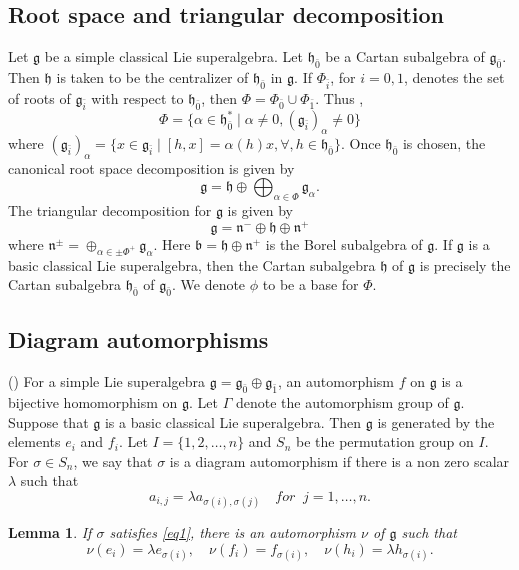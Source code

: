 \documentclass[11pt]{amsart}
\theoremstyle{plain}
\newtheorem{lemma}[thm]{Lemma}
\theoremstyle{definition}
\newcommand{\g}{\mathfrak{g}}
\newcommand{\h}{\mathfrak{h}}
\newcommand{\n}{\mathfrak{n}}
\begin{document}
\subsection{Root space and triangular decomposition}
Let $\g$ be a simple classical Lie superalgebra. Let $\h_{\bar{0}}$ be a Cartan subalgebra of $\g_{\bar{0}}$. Then $\h$ is taken to be the centralizer of $\h_{\bar{0}}$ in $\g$. If $\Phi_{\bar{i}}$, for $i=0,1$, denotes the set of roots of $\g_{\bar{i}}$ with respect to $\h_{\bar{0}}$, then $\Phi=\Phi_{\bar{0}}\cup \Phi_{\bar{1}}$. Thus \label{pg:2},
\begin{equation*}
    \Phi=\{\alpha\in\h_{\bar{0}}^*\mid \alpha\neq 0, (\g_{\bar{i}})_{\alpha}\neq 0\}
\end{equation*}
where $(\g_{\bar{i}})_{\alpha}=\{x\in\g_{\bar{i}}\mid [h, x]=\alpha(h)x,\forall, h\in\h_{\bar{0}}\}$.
Once $\h_{\bar{0}}$ is chosen, the canonical root space decomposition is given by
\begin{equation*}
     \g=\h\oplus\bigoplus_{\alpha\in \Phi}\g_{\alpha}.
\end{equation*}
The triangular decomposition for $\g$ is given by 
\begin{equation*}
    \g=\n^-\oplus\h\oplus\n^+
\end{equation*}
where $\n^{\pm}=\oplus_{\alpha\in\pm\Phi^{+}}\g_{\alpha}$. Here $\mathfrak{b}=\h\oplus\n^+$ is the Borel subalgebra of $\g$. If $\g$ is a basic classical Lie superalgebra, then the Cartan subalgebra $\h$ of $\g$ is precisely the Cartan subalgebra $\h_{\bar{0}}$ of $\g_{\bar{0}}.$ We  denote $\phi$ to be a base for $\Phi$.

\subsection{Diagram automorphisms}(\cite{Mus12})
For a simple Lie superalgebra $\g=\g_{\bar{0}}\oplus \g_{\bar{1}}$, an automorphism $f$ on $\g$ is a bijective homomorphism on $\g$. Let $\Gamma$ denote the automorphism group of $\g$. Suppose that $\g$ is a basic classical Lie superalgebra. Then $\g$ is generated by the elements $e_i$ and $f_i$. Let $I=\{1,2,\ldots, n\}$ and $S_n$ be the permutation group on $I$. For $\sigma\in S_n$, we say that $\sigma$ is a diagram automorphism if there is a non zero scalar $\lambda$ such that 
\begin{equation}\label{eq1}
    a_{i, j}=\lambda a_{\sigma(i),\sigma(j)} \quad for\;\; j=1,\ldots,n.
\end{equation}
\begin{lemma}\label{lem9}
If $\sigma$ satisfies \eqref{eq1}, there is an automorphism $\nu$ of $\g$ such that 
    \begin{equation}
        \nu(e_i)=\lambda e_{\sigma(i)}, \quad \nu(f_i)= f_{\sigma(i)}, \quad \nu(h_i)=\lambda h_{\sigma(i)}.
    \end{equation}
\end{lemma}
\end{document}
